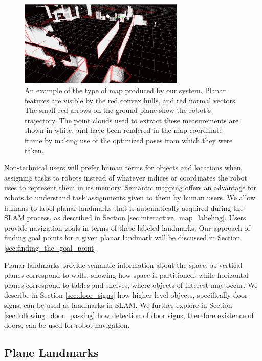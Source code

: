 \documentclass[3p]{elsarticle}
\begin{document}
\begin{figure}[ht!]
\begin{center}
\centering
\includegraphics[width=0.7\textwidth]{pics/semantic_map}
\caption{An example of the type of map produced by our system. Planar features
are visible by the red convex hulls, and red normal vectors. The small red arrows on
the ground plane show the robot’s trajectory. The point clouds used to extract these
measurements are shown in white, and have been rendered in the map coordinate
frame by making use of the optimized poses from which they were taken.} 
\label{fig:semantic_map}
\end{center}
\end{figure}


Non-technical users will prefer human terms
for objects and locations when assigning tasks to robots instead of whatever indices or coordinates the robot uses to represent them in its memory. Semantic mapping offers an advantage for robots to understand task assignments given to them by human users. We allow humans to label planar landmarks that is automatically acquired during the SLAM process, as described in Section \ref{sec:interactive_map_labeling}. Users provide navigation goals in terms of these labeled landmarks. Our approach of finding goal points for a given planar landmark will be discussed in Section \ref{sec:finding_the_goal_point}.

Planar landmarks provide semantic information about the space, as vertical planes correspond to walls, showing how space is partitioned, while horizontal planes correspond to tables and shelves, where objects of interest may occur. We describe in Section \ref{sec:door_signs} how higher level objects, specifically door signs, can be used as landmarks in SLAM.  We further explore in Section \ref{sec:following_door_passing} how detection of door signs, therefore existence of doors, can be used for robot navigation.

\subsection{Plane Landmarks}
\end{document}
